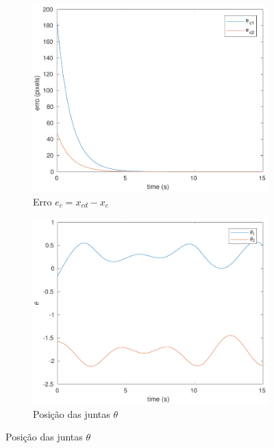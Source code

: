 \documentclass[a4paper,11pt]{article}
\theoremstyle{mytheor}
\begin{document}
\begin{figure}[ht]
\begin{minipage}{\linewidth}
    \begin{subfigure}[b]{0.49\textwidth}
    \includegraphics[width=1\textwidth]{figs/ex3_2_e_c.pdf}
    \caption{Erro $e_{c} = x_{cd} - x_c$}
    \label{fig:ex3_2_e_c}
    \end{subfigure}
  \end{minipage}
  \begin{minipage}{\linewidth}
  \centering
    \begin{subfigure}[b]{0.49\textwidth}
    \includegraphics[width=1\textwidth]{figs/ex3_2_q.pdf}
    \caption{Posição das juntas $\theta$}
    \label{fig:ex3_2_q}
    \end{subfigure}

\end{minipage}
\end{figure}
\end{document}
